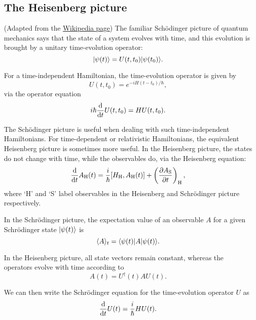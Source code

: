 \documentclass{article}
\begin{document}
\subsection{The Heisenberg picture}
(Adapted from the \href{https://en.wikipedia.org/wiki/Heisenberg_picture}{Wikipedia page}) The familiar Sch{\" o}dinger picture of quantum mechanics says that the state of a system evolves with time, and this evolution is brought by a unitary time-evolution operator:
\begin{equation}
|\psi(t)\rangle =U(t,t_0)|\psi(t_0)\rangle.
\end{equation}

For a time-independent Hamiltonian, the time-evolution operator is given by
\begin{equation}
U(t,t_0)=e^{-i{H}(t-t_0)/\hbar},
\end{equation}
via the operator equation
\begin{equation}
    i\hbar\diff{}{t} U(t,t_0)={H}{U}(t,t_0).
\end{equation}

The Sch{\" o}dinger picture is useful when dealing with such time-independent Hamiltonians. For time-dependent or relativistic Hamiltonians, the equivalent Heisenberg picture is sometimes more useful. In the Heisenberg picture, the states do not change with time, while the observables do, via the Heisenberg equation:
\begin{equation}
\label{eq:heisenberg_eq}
\diff{}{t}A_{\mathrm{H}}(t)=\frac{i}{\hbar}[H_{\mathrm{H}},A_{\mathrm{H}}(t)]+\left( \diffp{A_{\mathrm{S}}}{t} \right)_{\mathrm{H}},
\end{equation}
where `H' and `S' label observables in the Heisenberg and Schr{\" o}dinger picture respectively.

In the Schr{\" o}dinger picture, the expectation value of an observable $A$ for a given Schr{\" o}dinger state $|\psi(t)\rangle$ is
\begin{equation}
\langle A\rangle_t=\langle\psi(t)|A|\psi(t)\rangle.
\end{equation}

In the Heisenberg picture, all state vectors remain constant, whereas the operators evolve with time according to
\begin{equation}
    A(t)=U^{\dagger}(t)AU(t).
\end{equation}

We can then write the Schr{\" o}dinger equation for the time-evolution operator $U$ as
\begin{equation}
\diff{}{t} U(t)=\frac{i}{\hbar}HU(t).
\end{equation}
\end{document}
